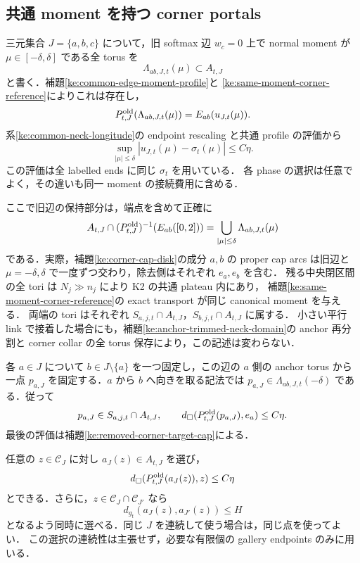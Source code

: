 \subsection{共通 moment を持つ corner portals}

三元集合 $J=\{a,b,c\}$ について，旧 softmax 辺 $w_c=0$ 上で
normal moment が $\mu\in[-\delta,\delta]$ である全 torus を
\[
 \Lambda_{ab,J,t}(\mu)\subset A_{t,J}
\]
と書く．補題\ref{ke:common-edge-moment-profile}と
\ref{ke:same-moment-corner-reference}によりこれは存在し，
\[
 P^{\rm old}_{t,J}(\Lambda_{ab,J,t}(\mu))
       =E_{ab}(u_{J,t}(\mu)).
\]
系\ref{ke:common-neck-longitude}の endpoint rescaling と共通 profile の評価から
\begin{equation}\label{ke:eq:portal-profile-error}
 \sup_{|\mu|\le\delta}|u_{J,t}(\mu)-\sigma_t(\mu)|\le C\eta .
\end{equation}
この評価は全 labelled ends に同じ $\sigma_t$ を用いている．
各 phase の選択は任意でよく，その違いも同一 moment の接続費用に含める．

ここで旧辺の保持部分は，端点を含めて正確に
\[
 A_{t,J}\cap(P^{\rm old}_{t,J})^{-1}(E_{ab}([0,2]))
 =\bigcup_{|\mu|\le\delta}\Lambda_{ab,J,t}(\mu)
\]
である．実際，補題\ref{ke:corner-cap-disk}の成分 $a,b$ の proper cap arcs は旧辺と
$\mu=-\delta,\delta$ で一度ずつ交わり，除去側はそれぞれ $e_a,e_b$ を含む．
残る中央閉区間の全 tori は $N_j\gg n_j$ により K2 の共通 plateau 内にあり，
補題\ref{ke:same-moment-corner-reference}の exact transport が同じ canonical moment を与える．
両端の tori はそれぞれ $S_{a,j,t}\cap A_{t,J}$，$S_{b,j,t}\cap A_{t,J}$ に属する．
小さい平行 link で接着した場合にも，補題\ref{ke:anchor-trimmed-neck-domain}の
anchor 再分割と corner collar の全 torus 保存により，この記述は変わらない．

各 $a\in J$ について $b\in J\setminus\{a\}$ を一つ固定し，この辺の $a$ 側の
anchor torus から一点 $p_{a,J}$ を固定する．$a$ から $b$ へ向きを取る記法では
$p_{a,J}\in\Lambda_{ab,J,t}(-\delta)$ である．従って
\[
 p_{a,J}\in S_{a,j,t}\cap A_{t,J},\qquad
 d_\square(P^{\rm old}_{t,J}(p_{a,J}),e_a)\le C\eta .
\]
最後の評価は補題\ref{ke:removed-corner-target-cap}による．

\begin{lemma}
\label{ke:coherent-corner-portals}
任意の $z\in\mathcal C_J$ に対し $a_J(z)\in A_{t,J}$ を選び，
\begin{equation}\label{ke:eq:corner-portal-target-error}
 d_\square(P^{\rm old}_{t,J}(a_J(z)),z)\le C\eta
\end{equation}
とできる．さらに，$z\in\mathcal C_J\cap\mathcal C_{J'}$ なら
\begin{equation}\label{ke:eq:corner-portal-junction-cost}
 d_{g_t}(a_J(z),a_{J'}(z))\le H
\end{equation}
となるよう同時に選べる．同じ $J$ を連続して使う場合は，同じ点を使ってよい．
この選択の連続性は主張せず，必要な有限個の gallery endpoints のみに用いる．
\end{lemma}

